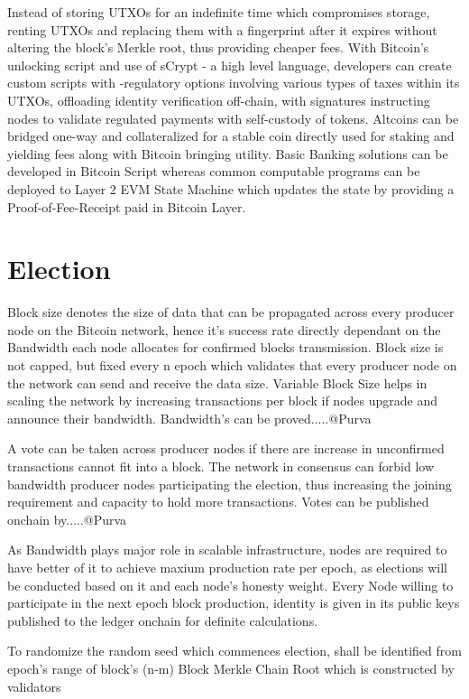 \documentclass[a4paper,10pt]{article}
\begin{document}
Instead of storing UTXOs for an indefinite time which compromises storage, renting UTXOs and replacing them with a fingerprint after it expires without altering the block's Merkle root, thus providing cheaper fees. With Bitcoin's unlocking script and use of sCrypt - a high level language, developers can create custom scripts with -regulatory options involving various types of taxes within its UTXOs, offloading identity verification off-chain, with signatures instructing nodes to validate regulated payments with self-custody of tokens. Altcoins can be bridged one-way and collateralized for a stable coin directly used for staking and yielding fees along with Bitcoin bringing utility. Basic Banking solutions can be developed in Bitcoin Script whereas common computable programs can be deployed to Layer 2 EVM State Machine which updates the state by providing a Proof-of-Fee-Receipt paid in Bitcoin Layer. 

\section{Election}
Block size denotes the size of data that can be propagated across every producer node on the Bitcoin network, hence it's success rate directly dependant on the Bandwidth each node allocates for confirmed blocks transmission. Block size is not capped, but fixed every n epoch which validates that every producer node on the network can send and receive the data size. Variable Block Size helps in scaling the network by increasing transactions per block if nodes upgrade and announce their bandwidth. Bandwidth's can be proved.....@Purva

A vote can be taken across producer nodes if there are increase in unconfirmed transactions cannot fit into a block. The network in consensus can forbid low bandwidth producer nodes participating the election, thus increasing the joining requirement and capacity to hold more transactions. Votes can be published onchain by.....@Purva

As Bandwidth plays major role in scalable infrastructure, nodes are required to have better of it to achieve maxium production rate per epoch, as elections will be conducted based on it and each node's honesty weight. Every Node willing to participate in the next epoch block production, identity is given in its public keys published to the ledger onchain for definite calculations.

To randomize the random seed which commences election, shall be identified from epoch's range of block's (n-m) Block Merkle Chain Root which is constructed by validators
\end{document}
